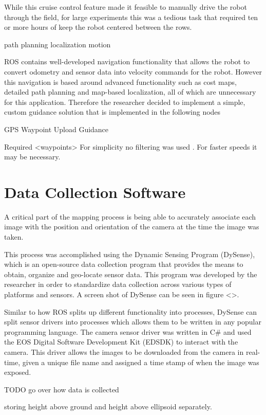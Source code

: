 While this cruise control feature made it feasible to manually drive the robot through the field, for large experiments this was a tedious task that required ten or more hours of keep the robot centered between the rows.  

path planning
localization
motion

ROS contains well-developed navigation functionality that allows the robot to convert odometry and sensor data into velocity commands for the robot.  However this navigation is based around advanced functionality such as cost maps, detailed path planning and map-based localization, all of which are unnecessary for this application.  Therefore the researcher decided to implement a simple, custom guidance solution that is implemented in the following nodes

GPS
Waypoint Upload
Guidance

Required <waypoints>
For simplicity no filtering was used . For faster speeds it may be necessary.

\section{Data Collection Software}
\label{system-software}

A critical part of the mapping process is being able to accurately associate each image with the position and orientation of the camera at the time the image was taken.  

This process was accomplished using the Dynamic Sensing Program (DySense), which is an open-source data collection program that provides the means to obtain, organize and geo-locate sensor data.  This program was developed by the researcher in order to standardize data collection across various types of platforms and sensors.  A screen shot of DySense can be seen in figure <>.

Similar to how ROS splits up different functionality into processes, DySense can split sensor drivers into processes which allows them to be written in any popular programming language.  The camera sensor driver was written in C# and used the EOS Digital Software Development Kit (EDSDK) to interact with the camera.  This driver allows the images to be downloaded from the camera in real-time, given a unique file name and assigned a time stamp of when the image was exposed.

TODO go over how data is collected

storing height above ground and height above ellipsoid separately.   

